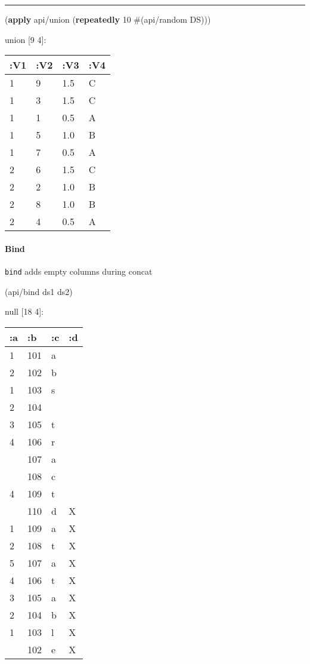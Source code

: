 \documentclass[]{article}
\newenvironment{Shaded}{\begin{snugshade}}{\end{snugshade}}
\newcommand{\DecValTok}[1]{\textcolor[rgb]{0.00,0.00,0.81}{#1}}
\newcommand{\KeywordTok}[1]{\textcolor[rgb]{0.13,0.29,0.53}{\textbf{#1}}}
\newcommand{\NormalTok}[1]{#1}
\let\oldparagraph\paragraph
\renewcommand{\paragraph}[1]{\oldparagraph{#1}\mbox{}}
\begin{document}
\begin{center}\rule{0.5\linewidth}{0.5pt}\end{center}

\begin{Shaded}
\begin{Highlighting}[]
\NormalTok{(}\KeywordTok{apply}\NormalTok{ api/union (}\KeywordTok{repeatedly} \DecValTok{10}\NormalTok{ #(api/random DS)))}
\end{Highlighting}
\end{Shaded}

union {[}9 4{]}:

\begin{longtable}[]{@{}llll@{}}
\toprule
:V1 & :V2 & :V3 & :V4\tabularnewline
\midrule
\endhead
1 & 9 & 1.5 & C\tabularnewline
1 & 3 & 1.5 & C\tabularnewline
1 & 1 & 0.5 & A\tabularnewline
1 & 5 & 1.0 & B\tabularnewline
1 & 7 & 0.5 & A\tabularnewline
2 & 6 & 1.5 & C\tabularnewline
2 & 2 & 1.0 & B\tabularnewline
2 & 8 & 1.0 & B\tabularnewline
2 & 4 & 0.5 & A\tabularnewline
\bottomrule
\end{longtable}

\hypertarget{bind}{%
\paragraph{Bind}\label{bind}}

\texttt{bind} adds empty columns during concat

\begin{Shaded}
\begin{Highlighting}[]
\NormalTok{(api/bind ds1 ds2)}
\end{Highlighting}
\end{Shaded}

null {[}18 4{]}:

\begin{longtable}[]{@{}llll@{}}
\toprule
:a & :b & :c & :d\tabularnewline
\midrule
\endhead
1 & 101 & a &\tabularnewline
2 & 102 & b &\tabularnewline
1 & 103 & s &\tabularnewline
2 & 104 & &\tabularnewline
3 & 105 & t &\tabularnewline
4 & 106 & r &\tabularnewline
& 107 & a &\tabularnewline
& 108 & c &\tabularnewline
4 & 109 & t &\tabularnewline
& 110 & d & X\tabularnewline
1 & 109 & a & X\tabularnewline
2 & 108 & t & X\tabularnewline
5 & 107 & a & X\tabularnewline
4 & 106 & t & X\tabularnewline
3 & 105 & a & X\tabularnewline
2 & 104 & b & X\tabularnewline
1 & 103 & l & X\tabularnewline
& 102 & e & X\tabularnewline
\bottomrule
\end{longtable}
\end{document}
